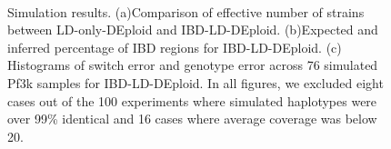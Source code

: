 \documentclass{article}
\begin{document}
\begin{figure}[htp]
  \centering{}
  \\
  \caption{Simulation results. (a)Comparison of effective number of strains between LD-only-DEploid and IBD-LD-DEploid. (b)Expected and inferred percentage of IBD regions for IBD-LD-DEploid. (c) Histograms of switch error and genotype error across 76 simulated Pf3k samples for IBD-LD-DEploid. In all figures, we excluded eight cases out of the 100 experiments where simulated haplotypes were over 99\% identical and 16 cases where average coverage was below 20.
}\label{fig:benchmark}
\end{figure}
\end{document}
